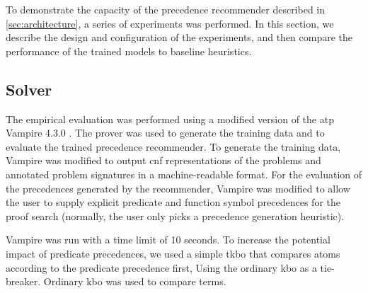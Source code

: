 
To demonstrate the capacity of the precedence recommender described in \cref{sec:architecture},
a series of experiments was performed.
In this section, we describe the design and configuration of the experiments,
and then compare the performance of the trained models to baseline heuristics.

\subsection{Solver}

The empirical evaluation was performed using a modified version of the \gls{atp} Vampire 4.3.0 \cite{10.1007/978-3-642-39799-8_1}.
The prover was used to generate the training data and to evaluate the trained precedence recommender.
To generate the training data,
Vampire was modified to output \gls{cnf} representations of the problems
and annotated problem signatures in a machine-readable format.
For the evaluation of the precedences generated by the recommender,
Vampire was modified to allow the user to supply explicit predicate and function symbol precedences for the proof search
(normally, the user only picks a precedence generation heuristic).


Vampire was run with a time limit of 10 seconds.
To increase the potential impact of predicate precedences,
we used a simple \gls{tkbo} \cite{Ludwig2007,Kovacs2011}
that compares atoms according to the predicate precedence first,
Using the ordinary \gls{kbo} as a tie-breaker.
Ordinary \gls{kbo} was used to compare terms.

